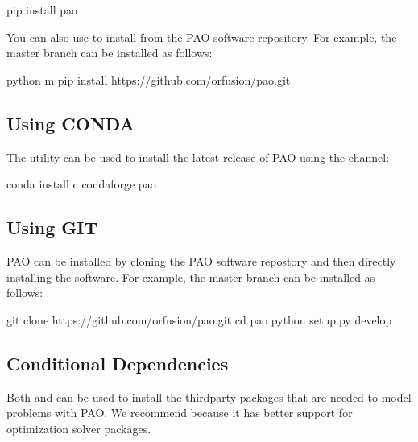 \documentclass[letterpaper,10pt,english]{sphinxmanual}
\begin{document}
\begin{sphinxVerbatim}[commandchars=\\\{\}]
pip install pao
\end{sphinxVerbatim}

You can also use  to install from the PAO software repository.
For example, the master branch can be installed as follows:

\begin{sphinxVerbatim}[commandchars=\\\{\}]
python \PYGZhy{}m pip install https://github.com/or\PYGZhy{}fusion/pao.git
\end{sphinxVerbatim}


\subsection{Using CONDA}
\label{\detokenize{installation:using-conda}}
The  utility can be used to install the latest release of PAO
using the  channel:

\begin{sphinxVerbatim}[commandchars=\\\{\}]
conda install \PYGZhy{}c conda\PYGZhy{}forge pao
\end{sphinxVerbatim}


\subsection{Using GIT}
\label{\detokenize{installation:using-git}}
PAO can be installed by cloning the PAO software repostory and
then directly installing the software.  For example, the master
branch can be installed as follows:

\begin{sphinxVerbatim}[commandchars=\\\{\}]
git clone https://github.com/or\PYGZhy{}fusion/pao.git
cd pao
python setup.py develop
\end{sphinxVerbatim}


\subsection{Conditional Dependencies}
\label{\detokenize{installation:conditional-dependencies}}
Both  and  can be used to install the third\sphinxhyphen{}party packages
that are needed to model problems with PAO.  We recommend 
because it has better support for optimization solver packages.
\end{document}
